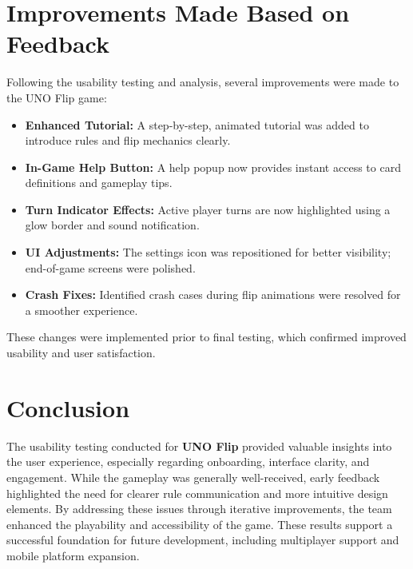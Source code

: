 \documentclass[12pt, titlepage]{article}
\begin{document}
\section{Improvements Made Based on Feedback}
Following the usability testing and analysis, several improvements were made to the UNO Flip game:
\begin{itemize}
    \item \textbf{Enhanced Tutorial:} A step-by-step, animated tutorial was added to introduce rules and flip mechanics clearly.
    \item \textbf{In-Game Help Button:} A help popup now provides instant access to card definitions and gameplay tips.
    \item \textbf{Turn Indicator Effects:} Active player turns are now highlighted using a glow border and sound notification.
    \item \textbf{UI Adjustments:} The settings icon was repositioned for better visibility; end-of-game screens were polished.
    \item \textbf{Crash Fixes:} Identified crash cases during flip animations were resolved for a smoother experience.
\end{itemize}

These changes were implemented prior to final testing, which confirmed improved usability and user satisfaction.

\section{Conclusion}
The usability testing conducted for \textbf{UNO Flip} provided valuable insights into the user experience, especially regarding onboarding, interface clarity, and engagement. While the gameplay was generally well-received, early feedback highlighted the need for clearer rule communication and more intuitive design elements. By addressing these issues through iterative improvements, the team enhanced the playability and accessibility of the game. These results support a successful foundation for future development, including multiplayer support and mobile platform expansion.
\end{document}

